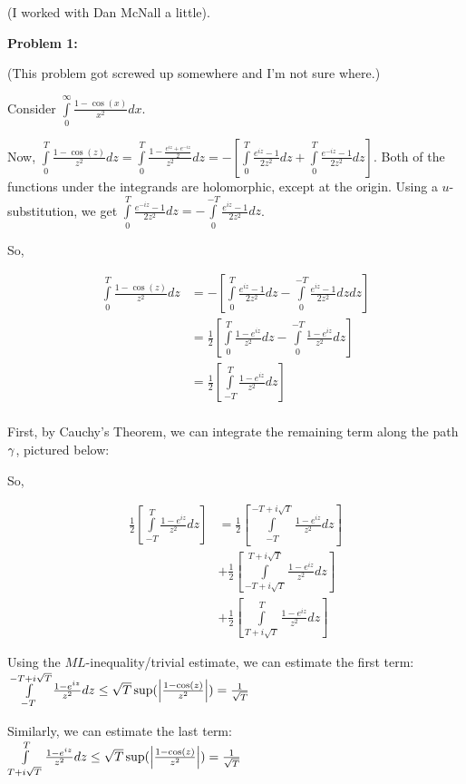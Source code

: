 \documentclass[a4paper,12pt]{article}
\begin{document}
(I worked with Dan McNall a little).

{\bf Problem 1:} %

(This problem got screwed up somewhere and I'm not sure where.)

Consider $\int\limits_0^\infty \frac{1-\cos(x)}{x^2} dx$.

Now, $\int\limits_0^T\frac{1-\cos(z)}{z^2} dz = \int\limits_0^T\frac{1-\frac{e^{iz}+e^{-iz}}{2}}{z^2} dz = -\left[\int\limits_0^T \frac{e^{iz}-1}{2z^2} dz+ \int\limits_0^T \frac{e^{-iz}-1}{2z^2} dz\right]$. Both of the functions under the integrands are holomorphic, except at the origin. Using a $u$-substitution, we get $\int\limits_0^T \frac{e^{-iz}-1}{2z^2} dz = -\int\limits_0^{-T} \frac{e^{iz}-1}{2z^2} dz$.

So, 

\begin{align*}
\int\limits_0^T\frac{1-\cos(z)}{z^2} dz &= -\left[\int\limits_0^T \frac{e^{iz}-1}{2z^2} dz- \int\limits_0^{-T} \frac{e^{iz}-1}{2z^2} dz dz\right]\\
&= \frac{1}{2}\left[\int\limits_0^T \frac{1-e^{iz}}{z^2} dz-\int\limits_0^{-T} \frac{1-e^{iz}}{z^2} dz \right]\\
&= \frac{1}{2}\left[\int\limits_{-T}^T \frac{1-e^{iz}}{z^2} dz \right]\\
\end{align*}

First, by Cauchy's Theorem, we can integrate the remaining term along the path $\gamma$, pictured below:

\shunt %

So, 

\begin{align*}
\frac{1}{2}\left[\int\limits_{-T}^T \frac{1-e^{iz}}{z^2} dz \right] &= \frac{1}{2}\left[\int\limits_{-T}^{-T+i\sqrt{T}} \frac{1-e^{iz}}{z^2} dz \right]\\
&+ \frac{1}{2}\left[\int\limits_{-T+i\sqrt{T}}^{T+i\sqrt{T}} \frac{1-e^{iz}}{z^2} dz \right]\\
&+ \frac{1}{2}\left[\int\limits_{T+i\sqrt{T}}^T \frac{1-e^{iz}}{z^2} dz \right]
\end{align*}

Using the $ML$-inequality/trivial estimate, we can estimate the first term: $\int\limits_{-T}^{-T+i\sqrt{T}} \frac{1-e^{iz}}{z^2} dz \leq \sqrt{T} \sup(\left\lvert \frac{1-\cos(z)}{z^2} \right\rvert) = \frac{1}{\sqrt{T}}$

Similarly, we can estimate the last term: $\int\limits_{T+i\sqrt{T}}^T \frac{1-e^{iz}}{z^2} dz \leq \sqrt{T} \sup(\left\lvert \frac{1-\cos(z)}{z^2} \right\rvert) = \frac{1}{\sqrt{T}}$
\end{document}
